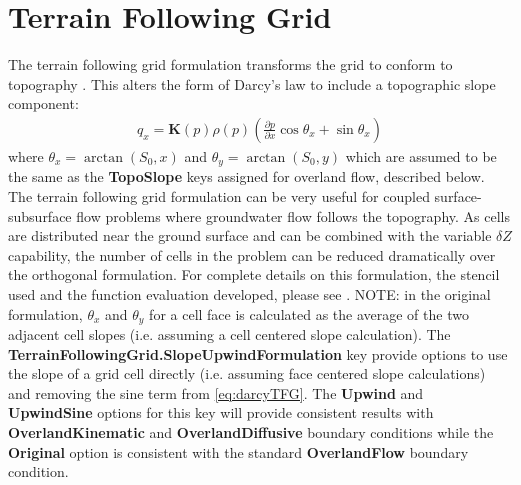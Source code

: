 \section{Terrain Following Grid}
\label{TFG}
The terrain following grid formulation transforms the \parflow{} grid to conform to topography \cite{M13}. This alters the form of Darcy's law to include a topographic slope component:
\begin{eqnarray}
q_x=\textbf{K}(p)\rho(p)(\frac{\partial p}{\partial x}\cos \theta_x + \sin \theta_x)
\label{eq:darcyTFG}
\end{eqnarray}
where $\theta_x = \arctan(S_0,x)$ and $\theta_y = \arctan(S_0,y)$ which are assumed to be the same as the {\bf TopoSlope} keys assigned for overland flow, described below.  The terrain following grid formulation can be very useful for coupled surface-subsurface flow problems where groundwater flow follows the topography.  As cells are distributed near the ground surface and can be combined with the variable $\delta Z$ capability, the number of cells in the problem can be reduced dramatically over the orthogonal formulation. For complete details on this formulation, the stencil used and the function evaluation developed, please see \cite{M13}. NOTE: in the original formulation, $\theta_x$ and $\theta_y$ for a cell face is calculated as the average of the two adjacent cell slopes (i.e. assuming a cell centered slope calculation). The {\bf TerrainFollowingGrid.SlopeUpwindFormulation} key provide options to use the slope of a grid cell directly (i.e. assuming face centered slope calculations) and removing the sine term from  \ref{eq:darcyTFG}. The {\bf Upwind} and {\bf UpwindSine} options for this key will provide consistent results with {\bf OverlandKinematic} and {\bf OverlandDiffusive} boundary conditions while the {\bf Original} option is consistent with the standard {\bf OverlandFlow} boundary condition.

